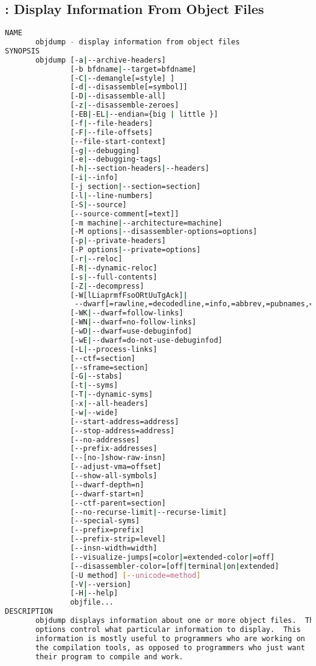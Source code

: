 % 
\subsection{: Display Information From Object Files}

{\tiny{
\begin{lstlisting}[language=bash]
NAME
       objdump - display information from object files
SYNOPSIS
       objdump [-a|--archive-headers]
               [-b bfdname|--target=bfdname]
               [-C|--demangle[=style] ]
               [-d|--disassemble[=symbol]]
               [-D|--disassemble-all]
               [-z|--disassemble-zeroes]
               [-EB|-EL|--endian={big | little }]
               [-f|--file-headers]
               [-F|--file-offsets]
               [--file-start-context]
               [-g|--debugging]
               [-e|--debugging-tags]
               [-h|--section-headers|--headers]
               [-i|--info]
               [-j section|--section=section]
               [-l|--line-numbers]
               [-S|--source]
               [--source-comment[=text]]
               [-m machine|--architecture=machine]
               [-M options|--disassembler-options=options]
               [-p|--private-headers]
               [-P options|--private=options]
               [-r|--reloc]
               [-R|--dynamic-reloc]
               [-s|--full-contents]
               [-Z|--decompress]
               [-W[lLiaprmfFsoORtUuTgAck]|
                --dwarf[=rawline,=decodedline,=info,=abbrev,=pubnames,=aranges,=macro,=frames,=frames-interp,=str,=str-offsets,=loc,=Ranges,=pubtypes,=trace_info,=trace_abbrev,=trace_aranges,=gdb_index,=addr,=cu_index,=links]]
               [-WK|--dwarf=follow-links]
               [-WN|--dwarf=no-follow-links]
               [-wD|--dwarf=use-debuginfod]
               [-wE|--dwarf=do-not-use-debuginfod]
               [-L|--process-links]
               [--ctf=section]
               [--sframe=section]
               [-G|--stabs]
               [-t|--syms]
               [-T|--dynamic-syms]
               [-x|--all-headers]
               [-w|--wide]
               [--start-address=address]
               [--stop-address=address]
               [--no-addresses]
               [--prefix-addresses]
               [--[no-]show-raw-insn]
               [--adjust-vma=offset]
               [--show-all-symbols]
               [--dwarf-depth=n]
               [--dwarf-start=n]
               [--ctf-parent=section]
               [--no-recurse-limit|--recurse-limit]
               [--special-syms]
               [--prefix=prefix]
               [--prefix-strip=level]
               [--insn-width=width]
               [--visualize-jumps[=color|=extended-color|=off]
               [--disassembler-color=[off|terminal|on|extended]
               [-U method] [--unicode=method]
               [-V|--version]
               [-H|--help]
               objfile...
DESCRIPTION
       objdump displays information about one or more object files.  The
       options control what particular information to display.  This
       information is mostly useful to programmers who are working on
       the compilation tools, as opposed to programmers who just want
       their program to compile and work.


\end{lstlisting}}}
